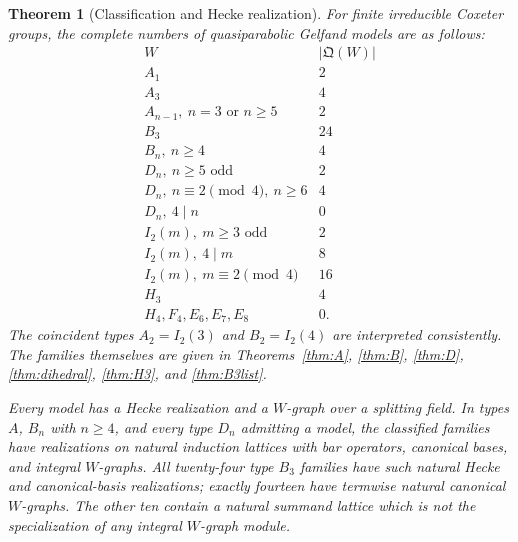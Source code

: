 \documentclass[11pt]{article}
\numberwithin{equation}{section}
\newtheorem{theorem}{Theorem}[section]
\theoremstyle{definition}
\newcommand{\QQ}{\mathfrak Q}
\begin{document}
\begin{theorem}[Classification and Hecke realization]
\label{thm:main}
For finite irreducible Coxeter groups, the complete numbers of quasiparabolic Gelfand models are as follows:
\[
\begin{array}{c|c}
 W&|\QQ(W)|\\ \hline
 A_1&2\\
 A_3&4\\
 A_{n-1},\ n=3\text{ or }n\geq5&2\\
 B_3&24\\
 B_n,\ n\geq4&4\\
 D_n,\ n\geq5\text{ odd}&2\\
 D_n,\ n\equiv2\pmod4,\ n\geq6&4\\
 D_n,\ 4\mid n&0\\
 I_2(m),\ m\geq3\text{ odd}&2\\
 I_2(m),\ 4\mid m&8\\
 I_2(m),\ m\equiv2\pmod4&16\\
 H_3&4\\
 H_4,F_4,E_6,E_7,E_8&0 .
\end{array}
\]
The coincident types \(A_2=I_2(3)\) and \(B_2=I_2(4)\) are interpreted consistently.
The families themselves are given in Theorems~\ref{thm:A}, \ref{thm:B}, \ref{thm:D}, \ref{thm:dihedral}, \ref{thm:H3}, and \ref{thm:B3list}.

Every model has a Hecke realization and a \(W\)-graph over a splitting field.
In types \(A\), \(B_n\) with \(n\geq4\), and every type \(D_n\) admitting a model, the classified families have realizations on natural induction lattices with bar operators, canonical bases, and integral \(W\)-graphs.
All twenty-four type \(B_3\) families have such natural Hecke and canonical-basis realizations; exactly fourteen have termwise natural canonical \(W\)-graphs.
The other ten contain a natural summand lattice which is not the specialization of any integral \(W\)-graph module.
\end{theorem}
\end{document}
